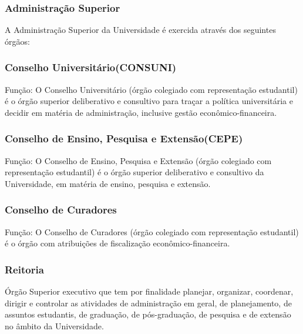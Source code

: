 \documentclass{report}
\begin{document}
\subsubsection{Administração Superior}

A Administração Superior da Universidade é exercida através dos seguintes órgãos:

\subsubsection{Conselho Universitário(CONSUNI)}

Função: O Conselho Universitário (órgão colegiado com representação estudantil) é o órgão superior deliberativo e consultivo para traçar a política universitária e decidir em matéria de administração, inclusive gestão econômico-financeira.


\subsubsection{Conselho de Ensino, Pesquisa e Extensão(CEPE)}

Função: O Conselho de Ensino, Pesquisa e Extensão (órgão colegiado com representação estudantil) é o órgão superior deliberativo e consultivo da Universidade, em matéria de ensino, pesquisa e extensão.

\subsubsection{Conselho de Curadores}

Função: O Conselho de Curadores (órgão colegiado com representação estudantil) é o órgão com atribuições de fiscalização econômico-financeira.

\subsubsection{Reitoria}

Órgão Superior executivo que tem por finalidade planejar, organizar, coordenar, dirigir e controlar as atividades de administração em geral, de planejamento, de assuntos estudantis, de graduação, de pós-graduação, de pesquisa e de extensão no âmbito da Universidade.
\end{document}
